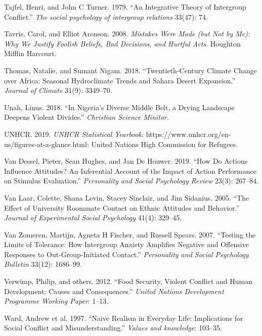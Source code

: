 \documentclass[11pt]{article}
\begin{document}
\begin{cslreferences}
\leavevmode\hypertarget{ref-tajfel1979integrative}{}%
Tajfel, Henri, and John C Turner. 1979. ``An Integrative Theory of
Intergroup Conflict.'' \emph{The social psychology of intergroup
relations} 33(47): 74.

\leavevmode\hypertarget{ref-tavris2008mistakes}{}%
Tavris, Carol, and Elliot Aronson. 2008. \emph{Mistakes Were Made (but
Not by Me): Why We Justify Foolish Beliefs, Bad Decisions, and Hurtful
Acts}. Houghton Mifflin Harcourt.

\leavevmode\hypertarget{ref-thomas2018sahara}{}%
Thomas, Natalie, and Sumant Nigam. 2018. ``Twentieth-Century Climate
Change over Africa: Seasonal Hydroclimate Trends and Sahara Desert
Expansion.'' \emph{Journal of Climate} 31(9): 3349--70.

\leavevmode\hypertarget{ref-unah2018nigeria}{}%
Unah, Linus. 2018. ``In Nigeria's Diverse Middle Belt, a Drying
Landscape Deepens Violent Divides.'' \emph{Christian Science Minitor}.

\leavevmode\hypertarget{ref-unhcr2019}{}%
UNHCR. 2019. \emph{UNHCR Statistical Yearbook}.
https://www.unhcr.org/en-us/figures-at-a-glance.html: United Nations
High Commission for Refugees.

\leavevmode\hypertarget{ref-van2019actions}{}%
Van Dessel, Pieter, Sean Hughes, and Jan De Houwer. 2019. ``How Do
Actions Influence Attitudes? An Inferential Account of the Impact of
Action Performance on Stimulus Evaluation.'' \emph{Personality and
Social Psychology Review} 23(3): 267--84.

\leavevmode\hypertarget{ref-van2005effect}{}%
Van Laar, Colette, Shana Levin, Stacey Sinclair, and Jim Sidanius. 2005.
``The Effect of University Roommate Contact on Ethnic Attitudes and
Behavior.'' \emph{Journal of Experimental Social Psychology} 41(4):
329--45.

\leavevmode\hypertarget{ref-van2007testing}{}%
Van Zomeren, Martijn, Agneta H Fischer, and Russell Spears. 2007.
``Testing the Limits of Tolerance: How Intergroup Anxiety Amplifies
Negative and Offensive Responses to Out-Group-Initiated Contact.''
\emph{Personality and Social Psychology Bulletin} 33(12): 1686--99.

\leavevmode\hypertarget{ref-verwimp2012food}{}%
Verwimp, Philip, and others. 2012. ``Food Security, Violent Conflict and
Human Development: Causes and Consequences.'' \emph{United Nations
Development Programme Working Paper}: 1--13.

\leavevmode\hypertarget{ref-ward1997naive}{}%
Ward, Andrew et al. 1997. ``Naive Realism in Everyday Life: Implications
for Social Conflict and Misunderstanding.'' \emph{Values and knowledge}:
103--35.


\end{cslreferences}
\end{document}
